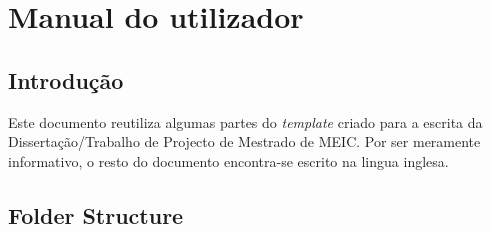% 
%  
%
\chapter{Manual do utilizador}
\label{cha:users_manual}

\section{Introdução} %
\label{sec:introduction}
Este documento reutiliza algumas partes do \textit{template} criado para a escrita da Dissertação/Trabalho de Projecto de Mestrado de MEIC. Por ser meramente informativo, o resto do documento encontra-se escrito na lingua inglesa.


\section{Folder Structure} %
\label{sec:folder_structure}

